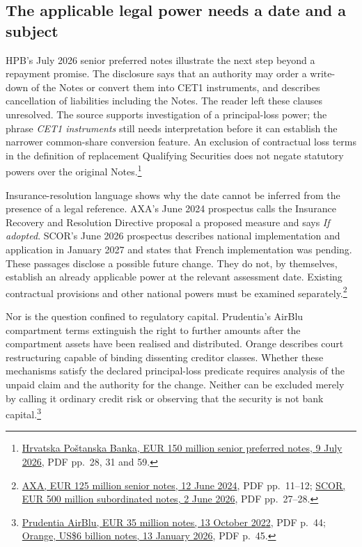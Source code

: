 \subsection{The applicable legal power needs a date and a subject}

HPB's July 2026 senior preferred notes illustrate the next step beyond a
repayment promise. The disclosure says that an authority may order a
write-down of the Notes or convert them into CET1 instruments, and describes
cancellation of liabilities including the Notes. The reader left these
clauses unresolved. The source supports investigation of a principal-loss
power; the phrase \emph{CET1 instruments} still needs interpretation before it
can establish the narrower common-share conversion feature. An exclusion
of contractual loss terms in the definition of replacement Qualifying
Securities does not negate statutory powers over the original
Notes.\footnote{\href{../prospectus/difficulty-2026-10-04/pdfs/case-105490784.pdf}
{Hrvatska Poštanska Banka, EUR 150 million senior preferred notes,
9 July 2026}, PDF pp.~28, 31 and 59.}

Insurance-resolution language shows why the date cannot be inferred from
the presence of a legal reference. AXA's June 2024 prospectus calls the
Insurance Recovery and Resolution Directive proposal a proposed measure
and says \emph{If adopted}. SCOR's June 2026 prospectus describes national
implementation and application in January 2027 and states that French
implementation was pending. These passages disclose a possible future
change. They do not, by themselves, establish an already applicable power
at the relevant assessment date. Existing contractual provisions and other
national powers must be examined separately.\footnote{
\href{../prospectus/difficulty-2026-10-04/pdfs/case-104224021.pdf}
{AXA, EUR 125 million senior notes, 12 June 2024}, PDF pp.~11--12;
\href{../prospectus/difficulty-2026-10-04/pdfs/case-105421783.pdf}
{SCOR, EUR 500 million subordinated notes, 2 June 2026}, PDF pp.~27--28.}

Nor is the question confined to regulatory capital. Prudentia's AirBlu
compartment terms extinguish the right to further amounts after the
compartment assets have been realised and distributed. Orange describes
court restructuring capable of binding dissenting creditor classes. Whether
these mechanisms satisfy the declared principal-loss predicate requires
analysis of the unpaid claim and the authority for the change. Neither
can be excluded merely by calling it ordinary credit risk or observing
that the security is not bank capital.\footnote{
\href{../prospectus/difficulty-2026-10-04/pdfs/case-103216017.pdf}
{Prudentia AirBlu, EUR 35 million notes, 13 October 2022}, PDF p.~44;
\href{../prospectus/difficulty-2026-10-04/pdfs/case-105155475.pdf}
{Orange, US\$6 billion notes, 13 January 2026}, PDF p.~45.}


